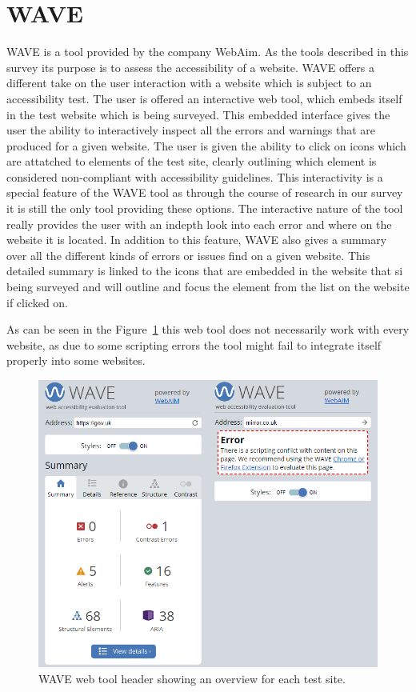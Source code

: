 \section{WAVE}

WAVE \parencite{WAVE_web} is a tool provided by the company WebAim. As
the tools described in this survey its purpose is to assess the
accessibility of a website. WAVE offers a different take on the user
interaction with a website which is subject to an accessibility
test. The user is offered an interactive web tool, which embeds itself
in the test website which is being surveyed.  This embedded interface
gives the user the ability to interactively inspect all the errors and
warnings that are produced for a given website. The user is given the
ability to click on icons which are attatched to elements of the test
site, clearly outlining which element is considered non-compliant with
accessibility guidelines. This interactivity is a special feature of
the WAVE tool as through the course of research in our survey it is
still the only tool providing these options. The interactive nature of
the tool really provides the user with an indepth look into each error
and where on the website it is located. In addition to this feature,
WAVE also gives a summary over all the different kinds of errors or
issues find on a given website. This detailed summary is linked to the
icons that are embedded in the website that si being surveyed and will
outline and focus the element from the list on the website if clicked
on.

As can be seen in the Figure~\ref{fig:WAVE} this web tool does
not necessarily work with every website, as due to some scripting
errors the tool might fail to integrate itself properly into some
websites.


\begin{figure}[h!]
\centering
\includegraphics[keepaspectratio,width=\linewidth,height=\halfh]
{images/WAVE.png}

\caption[Accessi Overview]
{%
WAVE web tool header showing an overview for each test site.
}
\label{fig:WAVE}
\end{figure}



